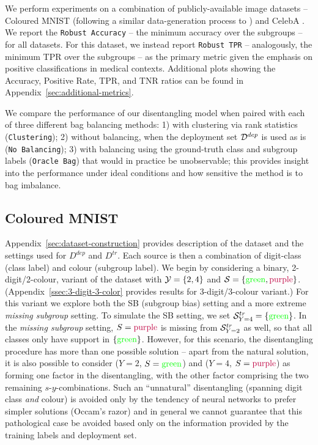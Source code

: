 We perform experiments on a combination of publicly-available image datasets -- Coloured MNIST
(following a similar data-generation process to \citet{KehBarThoQua20}) and CelebA
\citep{liu2015celeba}.
%
We report the \texttt{Robust Accuracy} -- the minimum accuracy over the subgroups -- for all
datasets.
%
For this dataset, we instead report \texttt{Robust TPR} -- analogously, the minimum \ac{TPR} over the
subgroups -- as the primary metric given the emphasis on positive classifications in medical
contexts. 
%
Additional plots showing the Accuracy, Positive Rate, \ac{TPR}, and \ac{TNR} ratios can be found in
Appendix~\ref{sec:additional-metrics}.

We compare the performance of our disentangling model when paired with each of three different bag
balancing methods: 1) with clustering via rank statistics (\texttt{Clustering}); 2) without
balancing, when the deployment set ${\mathcal{D}}^{dep}$ is used as is (\texttt{No Balancing}); 3) with
balancing using the ground-truth class and subgroup labels (\texttt{Oracle Bag}) that would in
practice be unobservable; this provides insight into the performance under ideal conditions and how
sensitive the method is to bag imbalance.
 
\subsection{Coloured MNIST}\label{ssec:cmnist_exp}
%

%
Appendix~\ref{sec:dataset-construction} provides description of the dataset and the settings used
for \( D^{dep} \) and \( D^{tr} \). 
%
Each source is then a combination of digit-class (class label) and colour (subgroup label). 
%
We begin by considering a binary, 2-digit/2-colour, variant of the dataset with ${\mathcal{Y}} = \{2, 4\}$
and ${\mathcal{S}} = \{\text{\color{green}green}, \text{\color{purple}purple}\}$.
(Appendix~\ref{ssec:3-digit-3-color} provides results for 3-digit/3-colour variant.) 
%
For this variant we explore both the SB (subgroup bias) setting and a more extreme \emph{missing
subgroup} setting.
%
To simulate the SB setting, we set \({\mathcal{S}}^{tr}_{ Y=4 }=\{\text{\color{green}{green}}\}\). 
%
In the \emph{missing subgroup} setting, $S=\text{\color{purple}{purple}}$ is missing from
\({\mathcal{S}}^{tr}_{ Y=2 }\) as well, so that all classes only have support in
\(\{\text{\color{green}{green}}\}\).
%
However, for this scenario, the disentangling procedure has more than one possible solution --
apart from the natural solution, it is also possible to consider ($Y=2$,
$S=\text{\color{green}{green}}$) and ($Y=4$, $S=\text{\color{purple}{purple}}$) as forming one
factor in the disentangling, with the other factor comprising the two remaining
$s$-$y$-combinations.
%
Such an ``unnatural'' disentangling (spanning digit class \emph{and} colour) is avoided only by the
tendency of neural networks to prefer simpler solutions (Occam's razor) and in general we cannot
guarantee that this pathological case be avoided based only on the information provided by the
training labels and deployment set.

